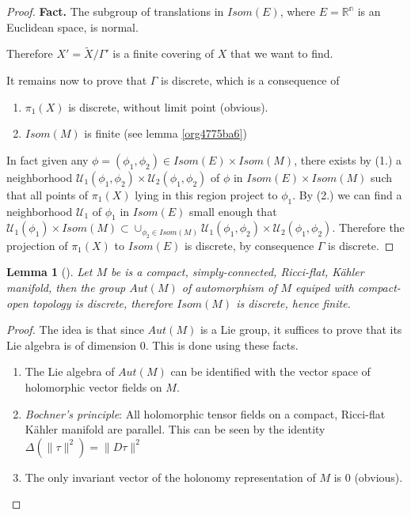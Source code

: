 \documentclass[11pt]{article}
\newtheorem{lemma}[theorem]{Lemma}
\begin{document}
\begin{proof}
\textbf{Fact.} The subgroup of translations in \(Isom(E)\), where \(E = \mathbb{R^n}\) is an Euclidean space, is
normal.

Therefore \(X' = \tilde X/\Gamma'\) is a finite covering of \(X\) that we want to find.

It remains now to prove that \(\Gamma\) is discrete, which is a consequence of
\begin{enumerate}
\item \(\pi_1(X)\) is discrete, without limit point (obvious).
\item \(Isom(M)\) is finite (see lemma \ref{org4775ba6})
\end{enumerate}
In fact given any \(\phi = (\phi_1,\phi_2) \in Isom(E)\times Isom(M)\), there exists by (1.) a neighborhood \(\mathcal{U}_1(\phi_1,\phi_2)\times \mathcal{U}_2(\phi_1,\phi_2)\) of \(\phi\) in \(Isom(E)\times
Isom(M)\) such that all points of \(\pi_1(X)\) lying in this region project to \(\phi_1\). By (2.)
we can find a neighborhood \(\mathcal{U}_1\) of \(\phi_1\) in \(Isom(E)\) small enough that \(\mathcal{U}_1(\phi_1)\times Isom(M) \subset \cup_{\phi_2\in Isom(M)}
\mathcal{U}_1(\phi_1,\phi_2)\times \mathcal{U}_2(\phi_1,\phi_2)\). Therefore the projection of
\(\pi_1(X)\) to \(Isom(E)\) is discrete, by consequence \(\Gamma\) is discrete.
\end{proof}

\begin{lemma}[]
\label{lem:Isom-discrete}
\label{org4775ba6}
Let \(M\) be is a compact, simply-connected, Ricci-flat, Kähler manifold, then the group \(Aut(M)\) of
automorphism of \(M\) equiped with compact-open topology is discrete, therefore \(Isom(M)\) is discrete,
hence finite. 
\end{lemma}
\begin{proof}
The idea is that since \(Aut(M)\) is a Lie group, it suffices to prove that its Lie algebra is of
dimension 0. This is done using these facts. 
\begin{enumerate}
\item The Lie algebra of \(Aut(M)\) can be identified with the vector space of holomorphic vector
fields on \(M\).
\item \emph{Bochner's principle}: All holomorphic tensor fields on a compact, Ricci-flat Kähler manifold are parallel. This can be seen by the identity
\(\Delta(\|\tau \|^2) = \|D\tau \|^2\)
\item The only invariant vector of the holonomy representation of \(M\) is \(0\) (obvious).
\end{enumerate}
\end{proof}
\end{document}
